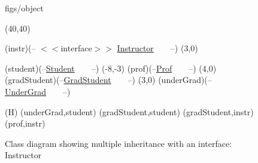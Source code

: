 





\begin {figure}


\Draw

 {figs/object}

\MinNodeSize(40,40)


\RectNode (instr)(-- $<<$interface$>>$
                  \underline {Instructor}~~~~--)
\MoveToExit(3,0)

\RectNode (student)(--\underline {Student}~~~~--)
\MoveToExit(-8,-3)
\RectNode (prof)(--\underline {Prof}~~~~--)
\MoveToExit(4,0)
\RectNode (gradStudent)(--\underline {GradStudent}~~~~--)
\MoveToExit(3,0)
\RectNode (underGrad)(--\underline {UnderGrad}~~~~--)

\ArrowSpec (H)
\Edge(underGrad,student)
\Edge(gradStudent,student)
\Edge(gradStudent,instr)
\Edge(prof,instr)

\EndDraw

\caption {Class diagram showing multiple inheritance with an
	interface: Instructor}


\label {fig:multInherInterface}

\end {figure}


